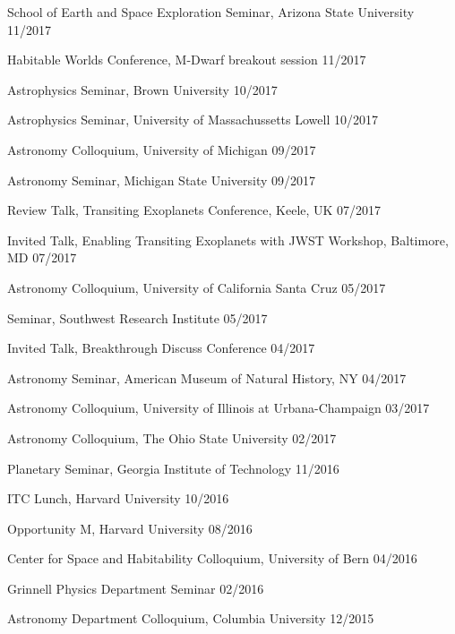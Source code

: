 \documentclass[12pt,letterpaper]{article}
\begin{document}
\begin{list}{}{\cvlist}
\item {School of Earth and Space Exploration Seminar, Arizona State University \hfill 11/2017}
\item {Habitable Worlds Conference, M-Dwarf breakout session \hfill 11/2017}
\item {Astrophysics Seminar, Brown University \hfill 10/2017}
\item {Astrophysics Seminar, University of Massachussetts Lowell \hfill 10/2017}
\item {Astronomy Colloquium, University of Michigan \hfill 09/2017}
\item {Astronomy Seminar, Michigan State University \hfill 09/2017}
\item {Review Talk, Transiting Exoplanets Conference, Keele, UK \hfill 07/2017}
\item {Invited Talk, Enabling Transiting Exoplanets with JWST Workshop, Baltimore, MD \hfill 07/2017}
\item {Astronomy Colloquium, University of California Santa Cruz \hfill 05/2017}
\item {Seminar, Southwest Research Institute \hfill 05/2017}
\item {Invited Talk, Breakthrough Discuss Conference \hfill 04/2017}
\item {Astronomy Seminar, American Museum of Natural History, NY \hfill 04/2017}
\item {Astronomy Colloquium, University of Illinois at Urbana-Champaign \hfill 03/2017}
\item {Astronomy Colloquium, The Ohio State University \hfill 02/2017}
\item {Planetary Seminar, Georgia Institute of Technology \hfill 11/2016}
\item {ITC Lunch, Harvard University \hfill 10/2016}
\item {Opportunity M, Harvard University \hfill 08/2016}
\item {Center for Space and Habitability Colloquium, University of Bern \hfill 04/2016}
\item {Grinnell Physics Department Seminar \hfill 02/2016}
\item {Astronomy Department Colloquium, Columbia University \hfill 12/2015}

\end{list}
\end{document}
